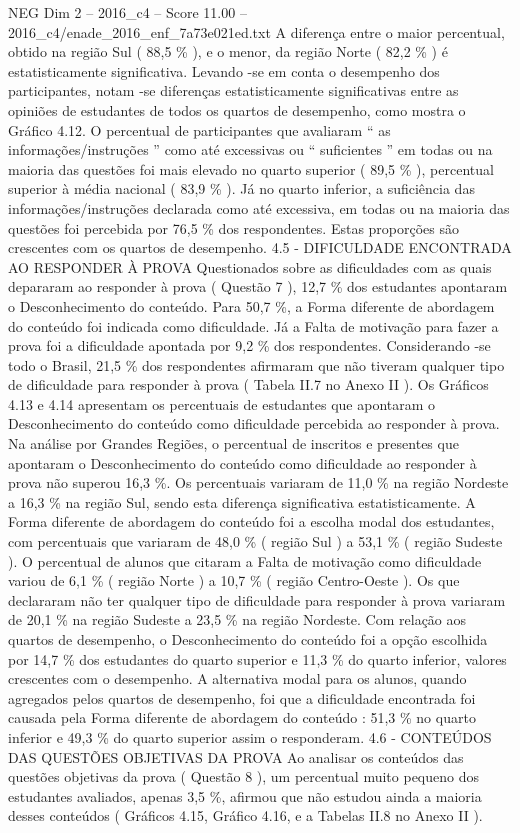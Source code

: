 \begin{textsample}{NEG Dim 2 – 2016\_c4 – Score 11.00 – 2016\_c4/enade\_2016\_enf\_7a73e021ed.txt}
A diferença entre o maior percentual, obtido na região Sul ( 88,5 \% ), e o menor, da região Norte ( 82,2 \% ) é estatisticamente significativa.
Levando -se em conta o desempenho dos participantes, notam -se diferenças estatisticamente significativas entre as opiniões de estudantes de todos os quartos de desempenho, como mostra o Gráfico 4.12.
O percentual de participantes que avaliaram “ as informações/instruções ” como até excessivas ou “ suficientes ” em todas ou na maioria das questões foi mais elevado no quarto superior ( 89,5 \% ), percentual superior à média nacional ( 83,9 \% ).
Já no quarto inferior, a suficiência das informações/instruções declarada como até excessiva, em todas ou na maioria das questões foi percebida por 76,5 \% dos respondentes.
Estas proporções são crescentes com os quartos de desempenho. 4.5 - DIFICULDADE ENCONTRADA AO RESPONDER À PROVA Questionados sobre as dificuldades com as quais depararam ao responder à prova ( Questão 7 ), 12,7 \% dos estudantes apontaram o Desconhecimento do conteúdo.
Para 50,7 \%, a Forma diferente de abordagem do conteúdo foi indicada como dificuldade.
Já a Falta de motivação para fazer a prova foi a dificuldade apontada por 9,2 \% dos respondentes.
Considerando -se todo o Brasil, 21,5 \% dos respondentes afirmaram que não tiveram qualquer tipo de dificuldade para responder à prova ( Tabela II.7 no Anexo II ).
Os Gráficos 4.13 e 4.14 apresentam os percentuais de estudantes que apontaram o Desconhecimento do conteúdo como dificuldade percebida ao responder à prova.
Na análise por Grandes Regiões, o percentual de inscritos e presentes que apontaram o Desconhecimento do conteúdo como dificuldade ao responder à prova não superou 16,3 \%.
Os percentuais variaram de 11,0 \% na região Nordeste a 16,3 \% na região Sul, sendo esta diferença significativa estatisticamente.
A Forma diferente de abordagem do conteúdo foi a escolha modal dos estudantes, com percentuais que variaram de 48,0 \% ( região Sul ) a 53,1 \% ( região Sudeste ).
O percentual de alunos que citaram a Falta de motivação como dificuldade variou de 6,1 \% ( região Norte ) a 10,7 \% ( região Centro-Oeste ).
Os que declararam não ter qualquer tipo de dificuldade para responder à prova variaram de 20,1 \% na região Sudeste a 23,5 \% na região Nordeste.
Com relação aos quartos de desempenho, o Desconhecimento do conteúdo foi a opção escolhida por 14,7 \% dos estudantes do quarto superior e 11,3 \% do quarto inferior, valores crescentes com o desempenho.
A alternativa modal para os alunos, quando agregados pelos quartos de desempenho, foi que a dificuldade encontrada foi causada pela Forma diferente de abordagem do conteúdo : 51,3 \% no quarto inferior e 49,3 \% do quarto superior assim o responderam. 4.6 - CONTEÚDOS DAS QUESTÕES OBJETIVAS DA PROVA Ao analisar os conteúdos das questões objetivas da prova ( Questão 8 ), um percentual muito pequeno dos estudantes avaliados, apenas 3,5 \%, afirmou que não estudou ainda a maioria desses conteúdos ( Gráficos 4.15, Gráfico 4.16, e a Tabelas II.8 no Anexo II ).

\end{textsample}
